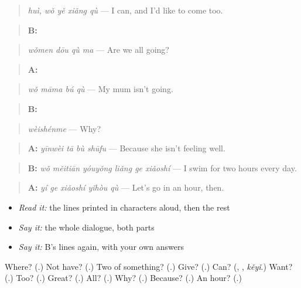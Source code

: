 \begin{quote}
\emph{huì, wǒ yě xiǎng qù} — I can, and I'd like to come too.
\end{quote}

\begin{quote}
\textbf{B:} 
\end{quote}

\begin{quote}
\emph{wǒmen dōu qù ma} — Are we all going?
\end{quote}

\begin{quote}
\textbf{A:} 
\end{quote}

\begin{quote}
\emph{wǒ māma bú qù} — My mum isn't going.
\end{quote}

\begin{quote}
\textbf{B:} 
\end{quote}

\begin{quote}
\emph{wèishénme} — Why?
\end{quote}

\begin{quote}
\textbf{A:} \emph{yīnwèi tā bù shūfu} — Because she isn't feeling well.
\end{quote}

\begin{quote}
\textbf{B:} \emph{wǒ měitiān yóuyǒng liǎng ge xiǎoshí} — I swim for two hours every day.
\end{quote}

\begin{quote}
\textbf{A:} \emph{yí ge xiǎoshí yǐhòu qù} — Let's go in an hour, then.
\end{quote}

\begin{itemize}
\raggedright
  \item \emph{Read it:} the lines printed in characters aloud, then the rest
  \item \emph{Say it:} the whole dialogue, both parts
  \item \emph{Say it:} B's lines again, with your own answers
\end{itemize}

\begin{tcolorbox}[breakable,colback=teal!4,colframe=teal!35!black,title={Before you move on}]
Where? (\textbf{}.) Not have? (\textbf{}.) Two of something? (\textbf{}.) Give? (\textbf{}.) Can? (\textbf{}, \textbf{}, \emph{kěyǐ}.) Want? (\textbf{}.) Too? (\textbf{}.) Great? (\textbf{}.) All? (\textbf{}.) Why? (\textbf{}.) Because? (\textbf{}.) An hour? (\textbf{}.)
\end{tcolorbox}

